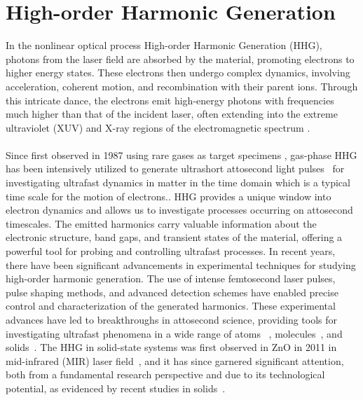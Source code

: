 \section{High-order Harmonic Generation}
In the nonlinear optical process High-order Harmonic Generation (\gls{HHG}), photons from the laser field are absorbed by the material, promoting electrons to higher energy states. These electrons then undergo complex dynamics, involving acceleration, coherent motion, and recombination with their parent ions. Through this intricate dance, the electrons emit high-energy photons with frequencies much higher than that of the incident laser, often extending into the extreme ultraviolet (XUV) and X-ray regions of the electromagnetic spectrum \cite{gaumnitz2017streaking}.\\
\\
Since first observed in 1987 using rare gases as target specimens \cite{McPherson:87, Ferray_1988},  gas-phase HHG has been intensively utilized to generate ultrashort attosecond light pulses~\cite{PhysRevLett.68.3535, PhysRevLett.70.1599, PhysRevA.49.2117} for investigating ultrafast dynamics in matter in the time domain which is a typical time scale for the motion of electrons.\cite{baltuvska2003attosecond, Goulielmakis2010, doi:10.1126/science.1260311, doi:10.1126/science.aag1268}. HHG provides a unique window into electron dynamics and allows us to investigate processes occurring on attosecond timescales. The emitted harmonics carry valuable information about the electronic structure, band gaps, and transient states of the material, offering a powerful tool for probing and controlling ultrafast processes.
In recent years, there have been significant advancements in experimental techniques for studying high-order harmonic generation. The use of intense femtosecond laser pulses, pulse shaping methods, and advanced detection schemes have enabled precise control and characterization of the generated harmonics. These experimental advances have led to breakthroughs in attosecond science, providing tools for investigating ultrafast phenomena in a wide range of atoms ~\cite{Goulielmakis2010,PhysRevLett.105.143002,PhysRevLett.106.123601}, molecules~\cite{Warrick2016,Reduzzi2016,PhysRevResearch.3.043222}, and solids~\cite{doi:10.1126/science.1260311, doi:10.1126/science.aag1268, Mashiko2016,Siegrist2019, vampa2017merge}. 
The HHG in solid-state systems was first observed in ZnO in 2011 in mid-infrared (MIR) laser field~\cite{Ghimire2011}, and it has since garnered significant attention, both from a fundamental research perspective and due to its technological potential, as evidenced by recent studies in solids~\cite{Ghimire2019, Silva2019, Nakagawa2022,gorlach2022high, neufeld2023universal}.
